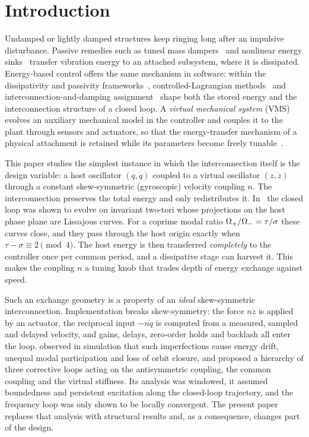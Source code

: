 \section{Introduction}\label{sec:intro}

Undamped or lightly damped structures keep ringing long after an impulsive
disturbance.
Passive remedies such as tuned mass dampers~\citep{denhartog1956mechanical} and
nonlinear energy sinks~\citep{vakakis2008nonlinear} transfer vibration energy to
an attached subsystem, where it is dissipated.
Energy-based control offers the same mechanism in software: within the
dissipativity and passivity frameworks~\citep{willems1972dissipative,
vanderschaft2000l2}, controlled-Lagrangian
methods~\citep{bloch2000controlled,woolsey2004controlled} and
interconnection-and-damping assignment~\citep{ortega2002interconnection} shape
both the stored energy and the interconnection structure of a closed loop.
A \emph{virtual mechanical system} (VMS) evolves an auxiliary mechanical model in
the controller and couples it to the plant through sensors and actuators, so that
the energy-transfer mechanism of a physical attachment is retained while its
parameters become freely tunable~\citep{preumont2018vibration,juchem2024virtual}.

This paper studies the simplest instance in which the interconnection itself is
the design variable: a host oscillator $(q,\dot q)$ coupled to a virtual
oscillator $(z,\dot z)$ through a constant skew-symmetric (gyroscopic) velocity
coupling $n$.
The interconnection preserves the total energy and only redistributes it.
In~\citet{juchem2026shaping} the closed loop was shown to evolve on invariant
two-tori whose projections on the host phase plane are Lissajous curves.
For a coprime modal ratio $\Omega_+/\Omega_-=\tau/\sigma$ these curves close, and they
pass through the host origin exactly when $\tau-\sigma\equiv2\pmod4$.
The host energy is then transferred \emph{completely} to the controller once
per common period, and a dissipative stage can harvest it.
This makes the coupling $n$ a tuning knob that trades depth of energy
exchange against speed.

Such an exchange geometry is a property of an \emph{ideal} skew-symmetric
interconnection.
Implementation breaks skew-symmetry: the force $n\dot z$ is applied by an
actuator, the reciprocal input $-n\dot q$ is computed from a measured, sampled and
delayed velocity, and gains, delays, zero-order holds and backlash all enter the
loop.
\citet{juchem2027restoring} observed in simulation that such imperfections cause
energy drift, unequal modal participation and loss of orbit closure, and proposed
a hierarchy of three corrective loops acting on the antisymmetric coupling, the
common coupling and the virtual stiffness.
Its analysis was windowed, it assumed boundedness and persistent excitation along
the closed-loop trajectory, and the frequency loop was only shown to be locally
convergent.
The present paper replaces that analysis with structural results and, as a
consequence, changes part of the design.

